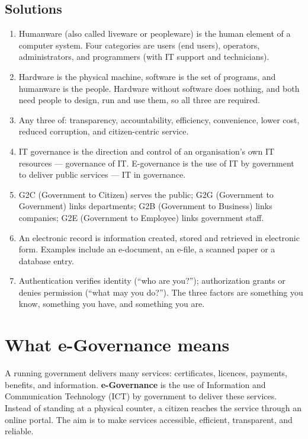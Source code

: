\subsection*{Solutions}
\begingroup\small
\begin{enumerate}[label=\arabic*.]
  \item Humanware (also called liveware or peopleware) is the human element of
    a computer system. Four categories are users (end users), operators,
    administrators, and programmers (with IT support and technicians).
  \item Hardware is the physical machine, software is the set of programs,
    and humanware is the people. Hardware without software does nothing, and
    both need people to design, run and use them, so all three are required.
  \item Any three of: transparency, accountability, efficiency, convenience,
    lower cost, reduced corruption, and citizen-centric service.
  \item IT governance is the direction and control of an organisation's own
    IT resources --- governance of IT. E-governance is the use of IT by
    government to deliver public services --- IT in governance.
  \item G2C (Government to Citizen) serves the public; G2G (Government to
    Government) links departments; G2B (Government to Business) links
    companies; G2E (Government to Employee) links government staff.
  \item An electronic record is information created, stored and retrieved in
    electronic form. Examples include an e-document, an e-file, a scanned
    paper or a database entry.
  \item Authentication verifies identity (``who are you?''); authorization
    grants or denies permission (``what may you do?''). The three factors are
    something you know, something you have, and something you are.
\end{enumerate}
\endgroup

\section{What e-Governance means}
A running government delivers many services: certificates, licences,
payments, benefits, and information. \textbf{e-Governance} is the use of
Information and Communication Technology (ICT) by government to deliver
these services. Instead of standing at a physical counter, a citizen reaches
the service through an online portal. The aim is to make services
accessible, efficient, transparent, and reliable.


